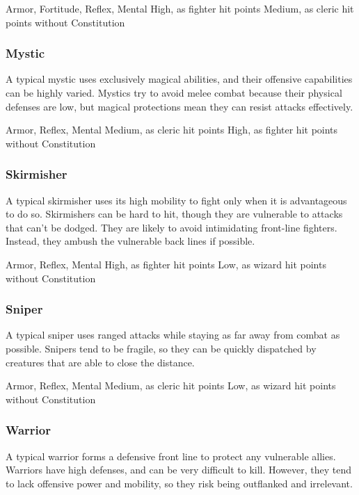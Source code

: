         Armor,  Fortitude,  Reflex,  Mental
       High, as fighter hit points
       Medium, as cleric hit points without Constitution

    \subsubsection{Mystic}
      A typical mystic uses exclusively magical abilities, and their offensive capabilities can be highly varied.
      Mystics try to avoid melee combat because their physical defenses are low, but magical protections mean they can resist attacks effectively.

        Armor,  Reflex,  Mental
       Medium, as cleric hit points
       High, as fighter hit points without Constitution

    \subsubsection{Skirmisher}
      A typical skirmisher uses its high mobility to fight only when it is advantageous to do so.
      Skirmishers can be hard to hit, though they are vulnerable to attacks that can't be dodged.
      They are likely to avoid intimidating front-line fighters.
      Instead, they ambush the vulnerable back lines if possible.

        Armor,  Reflex,  Mental
       High, as fighter hit points
       Low, as wizard hit points without Constitution

    \subsubsection{Sniper}
      A typical sniper uses ranged attacks while staying as far away from combat as possible.
      Snipers tend to be fragile, so they can be quickly dispatched by creatures that are able to close the distance.

        Armor,  Reflex,  Mental
       Medium, as cleric hit points
       Low, as wizard hit points without Constitution

    \subsubsection{Warrior}
      A typical warrior forms a defensive front line to protect any vulnerable allies.
      Warriors have high defenses, and can be very difficult to kill.
      However, they tend to lack offensive power and mobility, so they risk being outflanked and irrelevant.

